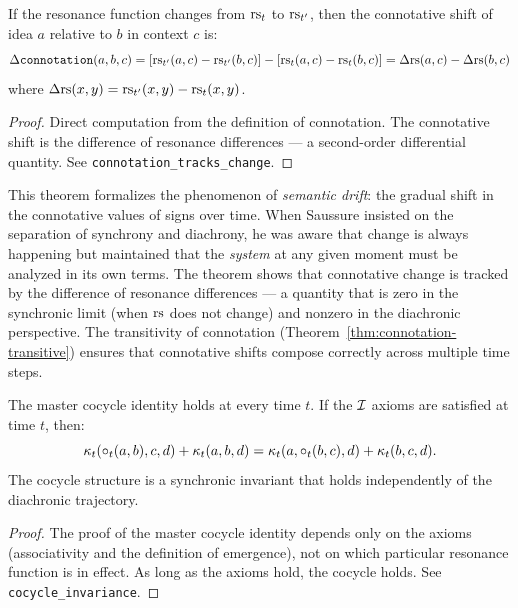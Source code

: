 \begin{theorem}
\label{thm:connotation-tracks-change}
If the resonance function changes from $\mathrm{rs}_t$ to $\mathrm{rs}_{t'}$, then
the connotative shift of idea $a$ relative to $b$ in context $c$ is:
\[
  \Delta\texttt{connotation}(a, b, c)
  = [\mathrm{rs}_{t'}(a, c) - \mathrm{rs}_{t'}(b, c)]
  - [\mathrm{rs}_t(a, c) - \mathrm{rs}_t(b, c)]
  = \Delta\mathrm{rs}(a, c) - \Delta\mathrm{rs}(b, c)
\]
where $\Delta\mathrm{rs}(x, y) = \mathrm{rs}_{t'}(x, y) - \mathrm{rs}_t(x, y)$.
\end{theorem}

\begin{proof}
Direct computation from the definition of connotation. The connotative
shift is the difference of resonance differences --- a second-order
differential quantity. See \texttt{connotation\_tracks\_change}.
\end{proof}

\begin{interpretation}
This theorem formalizes the phenomenon of \emph{semantic drift}: the
gradual shift in the connotative values of signs over time. When
Saussure insisted on the separation of synchrony and diachrony, he
was aware that change is always happening but maintained that the
\emph{system} at any given moment must be analyzed in its own terms.
The theorem shows that connotative change is tracked by the difference
of resonance differences --- a quantity that is zero in the synchronic
limit (when $\mathrm{rs}$ does not change) and nonzero in the diachronic
perspective. The transitivity of connotation
(Theorem~\ref{thm:connotation-transitive}) ensures that connotative
shifts compose correctly across multiple time steps.
\end{interpretation}

\begin{theorem}
\label{thm:cocycle-invariance}
The master cocycle identity holds at every time $t$. If the $\mathcal{I}$
axioms are satisfied at time $t$, then:
\[
  \kappa_t(\circ_t(a,b), c, d) + \kappa_t(a, b, d)
  = \kappa_t(a, \circ_t(b,c), d) + \kappa_t(b, c, d).
\]
The cocycle structure is a synchronic invariant that holds
independently of the diachronic trajectory.
\end{theorem}

\begin{proof}
The proof of the master cocycle identity depends only on the axioms
(associativity and the definition of emergence), not on which
particular resonance function is in effect. As long as the axioms hold,
the cocycle holds. See \texttt{cocycle\_invariance}.
\end{proof}

